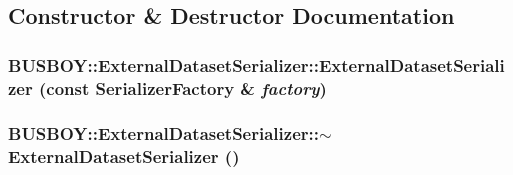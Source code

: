 \subsection{Constructor \& Destructor Documentation}
\hypertarget{classBUSBOY_1_1ExternalDatasetSerializer_a99d02a449b252c4e4275966427e619ba}{
\subsubsection[{ExternalDatasetSerializer}]{\setlength{\rightskip}{0pt plus 5cm}BUSBOY::ExternalDatasetSerializer::ExternalDatasetSerializer (const {\bf SerializerFactory} \& {\em factory})}}
\label{classBUSBOY_1_1ExternalDatasetSerializer_a99d02a449b252c4e4275966427e619ba}
\hypertarget{classBUSBOY_1_1ExternalDatasetSerializer_a3dd3a4b80adb6cb838fd41da30eda5f4}{
\subsubsection[{$\sim$ExternalDatasetSerializer}]{\setlength{\rightskip}{0pt plus 5cm}BUSBOY::ExternalDatasetSerializer::$\sim$ExternalDatasetSerializer ()}}
\label{classBUSBOY_1_1ExternalDatasetSerializer_a3dd3a4b80adb6cb838fd41da30eda5f4}



